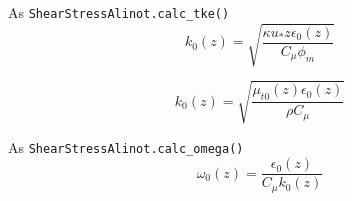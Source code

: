 \documentclass{article}
\begin{document}
As \texttt{ShearStressAlinot.calc\_tke()}
\begin{equation}
  k_0(z) = \sqrt{\frac{\kappa u_* z \epsilon_0(z)}{C_\mu \phi_m}}
\end{equation}

\begin{equation}
  k_0(z) = \sqrt{\frac{\mu_{t0}(z)\epsilon_0(z)}{\rho C_\mu}}
\end{equation}


As \texttt{ShearStressAlinot.calc\_omega()}
\begin{equation}
  \omega_0(z) = \frac{\epsilon_0(z)}{C_\mu k_0(z)}
\end{equation}



\end{document}
